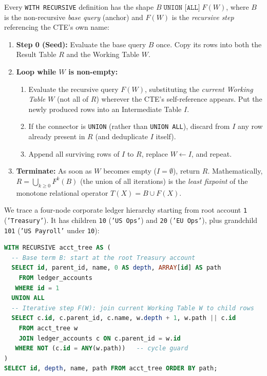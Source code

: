 Every \texttt{WITH RECURSIVE} definition has the shape $B \;\texttt{UNION [ALL]}\; F(W)$, where $B$ is the non-recursive \emph{base query} (anchor) and $F(W)$ is the \emph{recursive step} referencing the CTE's own name:

\begin{enumerate}
  \item \textbf{Step 0 (Seed):} Evaluate the base query $B$ once. Copy its rows into both the Result Table $R$ and the Working Table $W$.
  \item \textbf{Loop while $W$ is non-empty:}
  \begin{enumerate}
    \item Evaluate the recursive query $F(W)$, substituting the \emph{current Working Table $W$} (not all of $R$) wherever the CTE's self-reference appears. Put the newly produced rows into an Intermediate Table $I$.
    \item If the connector is \texttt{UNION} (rather than \texttt{UNION ALL}), discard from $I$ any row already present in $R$ (and deduplicate $I$ itself).
    \item Append all surviving rows of $I$ to $R$, replace $W \gets I$, and repeat.
  \end{enumerate}
  \item \textbf{Terminate:} As soon as $W$ becomes empty ($I = \emptyset$), return $R$. Mathematically, $R = \bigcup_{k \ge 0} F^k(B)$ (the union of all iterations) is the \emph{least fixpoint} of the monotone relational operator $T(X) = B \cup F(X)$.
\end{enumerate}

We trace a four-node corporate ledger hierarchy starting from root account \texttt{1} (\texttt{'Treasury'}). It has children \texttt{10} (\texttt{'US Ops'}) and \texttt{20} (\texttt{'EU Ops'}), plus grandchild \texttt{101} (\texttt{'US Payroll'} under \texttt{10}):

\begin{lstlisting}[language=SQL]
WITH RECURSIVE acct_tree AS (
  -- Base term B: start at the root Treasury account
  SELECT id, parent_id, name, 0 AS depth, ARRAY[id] AS path
    FROM ledger_accounts
   WHERE id = 1
  UNION ALL
  -- Iterative step F(W): join current Working Table W to child rows
  SELECT c.id, c.parent_id, c.name, w.depth + 1, w.path || c.id
    FROM acct_tree w
    JOIN ledger_accounts c ON c.parent_id = w.id
   WHERE NOT (c.id = ANY(w.path))   -- cycle guard
)
SELECT id, depth, name, path FROM acct_tree ORDER BY path;
\end{lstlisting}

